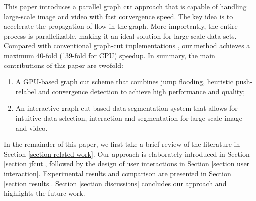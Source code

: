This paper introduces a parallel graph cut approach that is capable of handling large-scale image and video with fast convergence speed.
The key idea is to accelerate the propagation of flow in the graph.
More importantly, the entire process is parallelizable, making it an ideal solution for large-scale data sets.
Compared with conventional graph-cut implementations \cite{04BK, 11W, 12JSH}, our method achieves a maximum 40-fold (139-fold for CPU) speedup.
In summary, the main contributions of this paper are twofold:

\begin{enumerate}
\item A GPU-based graph cut scheme that combines jump flooding, heuristic push-relabel and convergence detection to achieve high performance and quality;
\item An interactive graph cut based data segmentation system that allows for intuitive data selection, interaction and segmentation for large-scale image and video.
\end{enumerate}

In the remainder of this paper, we first take a brief review of the literature in Section \ref{section related work}.
Our approach is elaborately introduced in Section \ref{section jfcut}, followed by the design of user interactions in Section \ref{section user interaction}.
Experimental results and comparison are presented in Section \ref{section results}.
Section \ref{section discussions} concludes our approach and highlights the future work.
